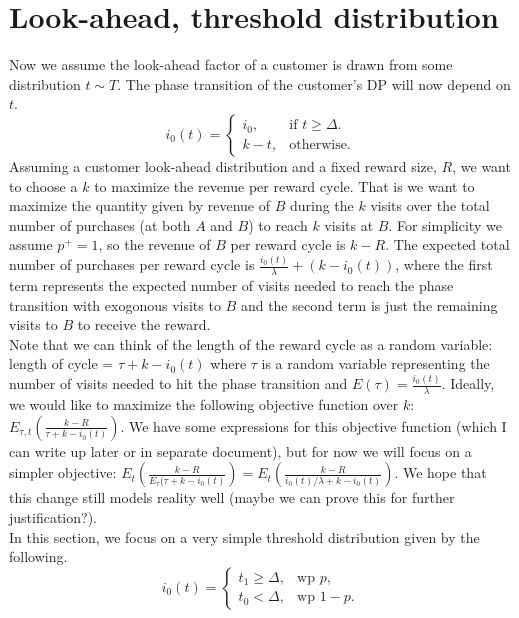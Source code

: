 \documentclass{article}
\begin{document}
\section{Look-ahead, threshold distribution}
Now we assume the look-ahead factor of a customer is drawn from some distribution $t \sim T$. The phase transition of the customer's DP will now depend on $t$.
\begin{equation*}
  i_0(t)=\begin{cases}
    i_0, & \text{if $t \geq \Delta$}.\\
    k-t, & \text{otherwise}.
  \end{cases}
\end{equation*}
Assuming a customer look-ahead distribution and a fixed reward size, $R$, we want to choose a $k$ to maximize the revenue per reward cycle. That is we want to maximize the quantity given by revenue of $B$ during the $k$ visits over the total number of purchases (at both $A$ and $B$) to reach $k$ visits at $B$. For simplicity we assume $p^+ = 1$, so the revenue of $B$ per reward cycle is $k-R$. The expected total number of purchases per reward cycle is $\frac{i_0(t)}{\lambda}+(k-i_0(t))$, where the first term represents the expected number of visits needed to reach the phase transition with exogonous visits to $B$ and the second term is just the remaining visits to $B$ to receive the reward. \\

Note that we can think of the length of the reward cycle as a random variable: length of cycle = $\tau+k-i_0(t)$ where $\tau$ is a random variable representing the number of visits needed to hit the phase transition and $E(\tau) = \frac{i_0(t)}{\lambda}$. Ideally, we would like to maximize the following objective function over $k$: $E_{\tau,t}\left(\frac{k-R}{\tau+k-i_0(t)} \right)$. We have some expressions for this objective function (which I can write up later or in separate document), but for now we will focus on a simpler objective: $E_t\left(\frac{k-R}{E_{\tau}(\tau+k-i_0(t)}\right) = E_t\left(\frac{k-R}{i_0(t)/\lambda+k-i_0(t)} \right)$. We hope that this change still models reality well (maybe we can prove this for further justification?). \\

In this section, we focus on a very simple threshold distribution given by the following.
\begin{equation*}
  i_0(t)=\begin{cases}
    t_1\geq \Delta, & \text{wp } p,\\
    t_0 < \Delta, & \text{wp } 1-p.
  \end{cases}
\end{equation*}
\end{document}
